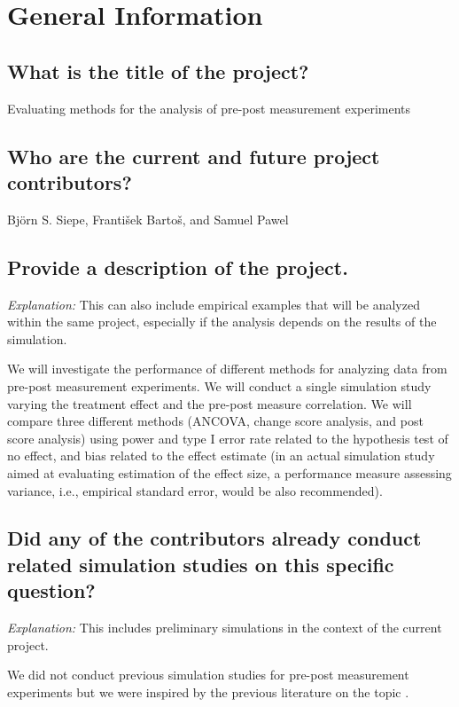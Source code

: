 \documentclass[12pt]{article}
\begin{document}
\section{General Information}
\subsection{What is the title of the project?}
\begin{examplebox}
    Evaluating methods for the analysis of pre-post measurement experiments 
\end{examplebox}


\subsection{Who are the current and future project contributors?}
\begin{examplebox}
    Björn S. Siepe, František Bartoš, and Samuel Pawel
\end{examplebox}


\subsection{Provide a description of the project.}
\textit{Explanation:} This can also include empirical examples that will be analyzed within the same project, especially if the analysis depends on the results of the simulation.
\begin{examplebox}
    We will investigate the performance of different methods for analyzing data from pre-post measurement experiments. We will conduct a single simulation study varying the treatment effect and the pre-post measure correlation. We will compare three different methods (ANCOVA, change score analysis, and post score analysis) using power and type I error rate related to the hypothesis test of no effect, and bias related to the effect estimate (in an actual simulation study aimed at evaluating estimation of the effect size, a performance measure assessing variance, i.e., empirical standard error, would be also recommended).  
\end{examplebox}

\subsection{Did any of the contributors already conduct related simulation studies on this specific question?}
\textit{Explanation:} This includes preliminary simulations in the context of the current project.
\begin{examplebox}
    We did not conduct previous simulation studies for pre-post measurement experiments but we were inspired by the previous literature on the topic \parencite{vickers2001use, senn2006change, van2013ancova, clifton2019correlation, ludtke2023ancova}.
\end{examplebox}
\end{document}
